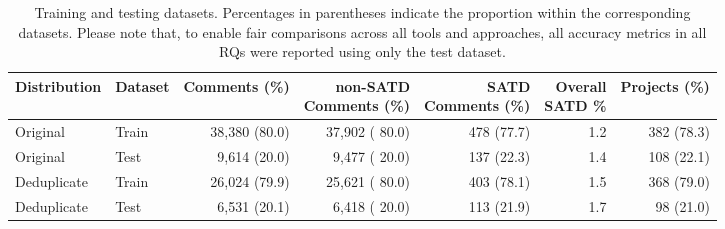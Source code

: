 \begin{table}[!ht]
\centering
\caption{Training and testing datasets. Percentages in parentheses indicate the proportion within the corresponding datasets. Please note that, to enable fair comparisons across all tools and approaches, all accuracy metrics in all RQs were reported using only the test dataset.}
\label{table:satd_detection_dataset}
\begin{adjustbox}{max width=\textwidth}
\begin{tabular}{llrrrrr}
\toprule
\textbf{Distribution} & \textbf{Dataset}  & \textbf{Comments (\%)}& \makecell{\textbf{non-SATD} \\ \textbf{Comments (\%)}} &  \makecell{\textbf{SATD} \\ \textbf{Comments (\%)}} & \makecell{\textbf{Overall} \\ \textbf{SATD \%}} & \textbf{Projects (\%)}\\
\midrule

Original & Train & 38,380 (80.0) & 37,902 ( 80.0) & 478 (77.7) & 1.2 & 382 (78.3) \\
Original & Test & 9,614 (20.0) & 9,477 ( 20.0) & 137 (22.3) & 1.4 & 108 (22.1) \\
Deduplicate & Train & 26,024 (79.9) & 25,621 ( 80.0) & 403 (78.1) & 1.5 & 368 (79.0) \\
Deduplicate & Test & 6,531 (20.1) & 6,418 ( 20.0) & 113 (21.9) & 1.7 & 98 (21.0) \\


\bottomrule
\end{tabular}
\end{adjustbox}
\end{table}
